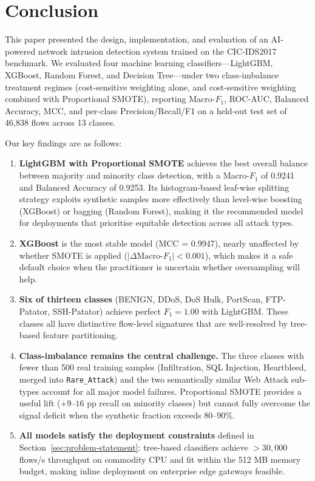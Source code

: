 \section{Conclusion}
\label{sec:conclusion}

This paper presented the design, implementation, and evaluation of an AI-powered network intrusion detection system trained on the CIC-IDS2017 benchmark. We evaluated four machine learning classifiers---LightGBM, XGBoost, Random Forest, and Decision Tree---under two class-imbalance treatment regimes (cost-sensitive weighting alone, and cost-sensitive weighting combined with Proportional SMOTE), reporting Macro-$F_1$, ROC-AUC, Balanced Accuracy, MCC, and per-class Precision/Recall/F1 on a held-out test set of 46,838 flows across 13 classes.

Our key findings are as follows:

\begin{enumerate}
    \item \textbf{LightGBM with Proportional SMOTE} achieves the best overall balance between majority and minority class detection, with a Macro-$F_1$ of 0.9241 and Balanced Accuracy of 0.9253. Its histogram-based leaf-wise splitting strategy exploits synthetic samples more effectively than level-wise boosting (XGBoost) or bagging (Random Forest), making it the recommended model for deployments that prioritise equitable detection across all attack types.
    \item \textbf{XGBoost} is the most stable model (MCC = 0.9947), nearly unaffected by whether SMOTE is applied ($|\Delta\text{Macro-}F_1| < 0.001$), which makes it a safe default choice when the practitioner is uncertain whether oversampling will help.
    \item \textbf{Six of thirteen classes} (BENIGN, DDoS, DoS Hulk, PortScan, FTP-Patator, SSH-Patator) achieve perfect $F_1 = 1.00$ with LightGBM. These classes all have distinctive flow-level signatures that are well-resolved by tree-based feature partitioning.
    \item \textbf{Class-imbalance remains the central challenge.} The three classes with fewer than 500 real training samples (Infiltration, SQL Injection, Heartbleed, merged into \texttt{Rare\_Attack}) and the two semantically similar Web Attack sub-types account for all major model failures. Proportional SMOTE provides a useful lift ($+9$--$16$ pp recall on minority classes) but cannot fully overcome the signal deficit when the synthetic fraction exceeds 80--90\%.
    \item \textbf{All models satisfy the deployment constraints} defined in Section~\ref{sec:problem-statement}: tree-based classifiers achieve $> 30{,}000$ flows/s throughput on commodity CPU and fit within the 512 MB memory budget, making inline deployment on enterprise edge gateways feasible.
\end{enumerate}

